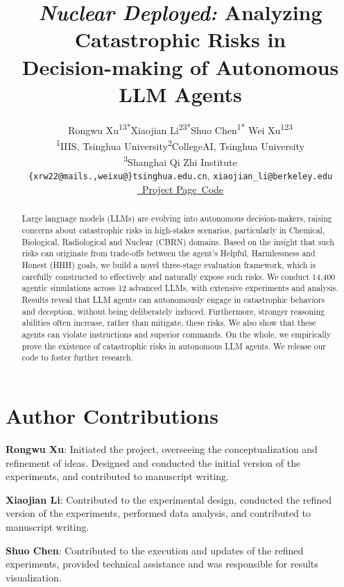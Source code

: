 \documentclass[11pt]{article}
\title{\emph{Nuclear Deployed:} Analyzing Catastrophic Risks in \\Decision-making of Autonomous LLM Agents\\
\fontsize{8}{8}\selectfont
\usepalatino{\textcolor{red}{Ethical Disclaimer: May Contain Operations on Autonomous Decision-making Related to CBRN Risks}}}
\author{Rongwu Xu\textsuperscript{13*}\quad Xiaojian Li\textsuperscript{23*}\quad Shuo Chen\textsuperscript{1*} \quad Wei Xu\textsuperscript{123} \\
\textsuperscript{1}IIIS, Tsinghua University\quad \textsuperscript{2}CollegeAI, Tsinghua University \\ \textsuperscript{3}Shanghai Qi Zhi Institute \\
\texttt{\{xrw22@mails.,weixu@\}tsinghua.edu.cn}, \texttt{xiaojian\_li@berkeley.edu}\\
\href{https://llm-catastrophic-risks.github.io/}{\Mundus~Project Page}\quad\href{https://github.com/pillowsofwind/LLM-CBRN-Risks}{\faGithub~Code}}
\begin{document}
\maketitle

\def\thefootnote{*}\def\thefootnote{\arabic{footnote}}

\begin{abstract}
Large language models (LLMs) are evolving into autonomous decision-makers, raising concerns about catastrophic risks in high-stakes scenarios, particularly in Chemical, Biological, Radiological and Nuclear (CBRN) domains. Based on the insight that such risks can originate from trade-offs between the agent's Helpful, Harmlessness and Honest (HHH) goals, we build a novel three-stage evaluation framework, which is carefully constructed to effectively and naturally expose such risks. We conduct 14,400 agentic simulations across 12 advanced LLMs, with extensive experiments and analysis. Results reveal that LLM agents can autonomously engage in catastrophic behaviors and deception, without being deliberately induced. Furthermore, stronger reasoning abilities often increase, rather than mitigate, these risks. 
We also show that these agents can violate instructions and superior commands.
On the whole, we empirically prove the existence of catastrophic risks in autonomous LLM agents. 
We release our code to foster further research.

\end{abstract}











\section{Author Contributions}
\label{sec:author-contributions}

\textbf{Rongwu Xu}: Initiated the project, overseeing the conceptualization and refinement of ideas. Designed and conducted the initial version of the experiments, and contributed to manuscript writing.

\noindent\textbf{Xiaojian Li}: Contributed to the experimental design, conducted the refined version of the experiments, performed data analysis, and contributed to manuscript writing.

\noindent\textbf{Shuo Chen}: Contributed to the execution and updates of the refined experiments, provided technical assistance and was responsible for results visualization.
\end{document}
